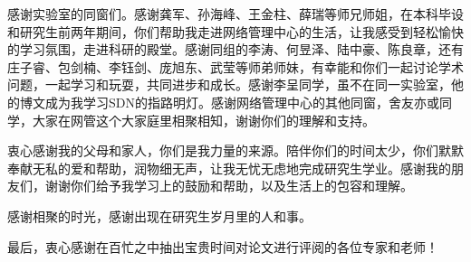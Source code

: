 \begin{acknowledgement}
感谢实验室的同窗们。感谢龚军、孙海峰、王金柱、薛瑞等师兄师姐，在本科毕设和研究生前两年期间，你们帮助我走进网络管理中心的生活，让我感受到轻松愉快的学习氛围，走进科研的殿堂。感谢同组的李涛、何昱泽、陆中豪、陈良章，还有庄子睿、包剑楠、李钰剑、庞旭东、武莹等师弟师妹，有幸能和你们一起讨论学术问题，一起学习和玩耍，共同进步和成长。感谢李呈同学，虽不在同一实验室，他的博文成为我学习SDN的指路明灯。感谢网络管理中心的其他同窗，舍友亦或同学，大家在网管这个大家庭里相聚相知，谢谢你们的理解和支持。

衷心感谢我的父母和家人，你们是我力量的来源。陪伴你们的时间太少，你们默默奉献无私的爱和帮助，润物细无声，让我无忧无虑地完成研究生学业。感谢我的朋友们，谢谢你们给予我学习上的鼓励和帮助，以及生活上的包容和理解。

感谢相聚的时光，感谢出现在研究生岁月里的人和事。

最后，衷心感谢在百忙之中抽出宝贵时间对论文进行评阅的各位专家和老师！

\end{acknowledgement}
